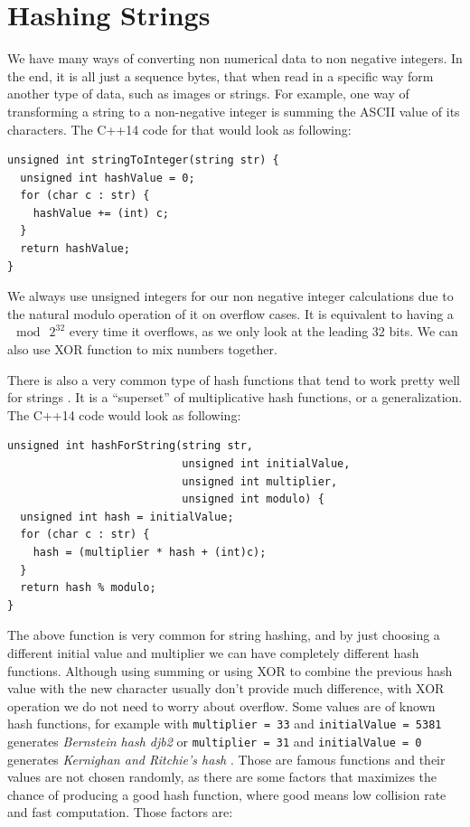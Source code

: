 \section{Hashing Strings}

We have many ways of converting non numerical data to non negative integers. In the end, it is all just a sequence bytes, that when read in a specific way form another type of data, such as images or strings. For example, one way of transforming a string to a non-negative integer is summing the ASCII value of its characters. The C++14 code for that would look as following:

\begin{lstlisting}
unsigned int stringToInteger(string str) {
  unsigned int hashValue = 0;
  for (char c : str) {
    hashValue += (int) c;
  }
  return hashValue;
}
\end{lstlisting}

We always use unsigned integers for our non negative integer calculations due to the natural modulo operation of it on overflow cases. It is equivalent to having a \( \mod \ 2^{32} \) every time it overflows, as we only look at the leading 32 bits. We can also use XOR function to mix numbers together. 

There is also a very common type of hash functions that tend to work pretty well for strings \citep{DragonHashFunc}. It is a ``superset'' of multiplicative hash functions, or a generalization. The C++14 code would look as following:

\begin{lstlisting}
unsigned int hashForString(string str,
                           unsigned int initialValue,
                           unsigned int multiplier,
                           unsigned int modulo) {
  unsigned int hash = initialValue;
  for (char c : str) {
    hash = (multiplier * hash + (int)c);
  }
  return hash % modulo;
}
\end{lstlisting}

The above function is very common for string hashing, and by just choosing a different initial value and multiplier we can have completely different hash functions. Although using summing or using XOR to combine the previous hash value with the new character usually don't provide much difference, with XOR operation we do not need to worry about overflow. Some values are of known hash functions, for example with \texttt{multiplier = 33} and \texttt{initialValue = 5381} generates \textit{Bernstein hash djb2} \citep{BernsteinHash} or \texttt{multiplier = 31} and \texttt{initialValue = 0} generates \textit{Kernighan and Ritchie's hash} \citep{KernighanHash}. Those are famous functions and their values are not chosen randomly, as there are some factors that maximizes the chance of producing a good hash function, where good means low collision rate and fast computation. Those factors are:

